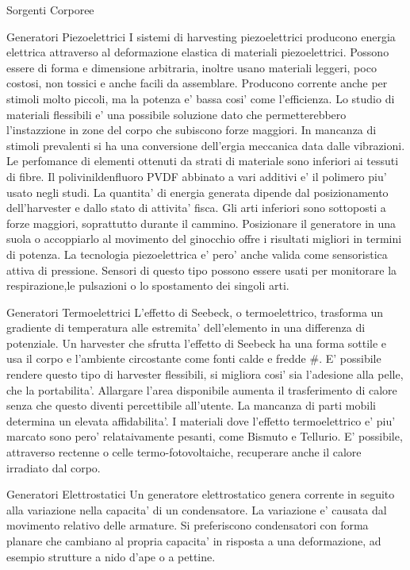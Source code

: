 \begin{multicols}{2}
\begin{section}{Sorgenti Corporee}
   \begin{subsection}{Generatori Piezoelettrici}
    I sistemi di harvesting piezoelettrici producono energia elettrica attraverso al deformazione elastica di materiali piezoelettrici. Possono essere di forma e dimensione arbitraria, inoltre usano materiali leggeri, poco costosi, non tossici e anche facili da assemblare. Producono corrente anche per stimoli molto piccoli, ma la potenza e' bassa cosi' come l'efficienza. Lo studio di materiali flessibili e' una possibile soluzione dato che permetterebbero l'instazzione in zone del corpo che subiscono forze maggiori. In mancanza di stimoli prevalenti si ha una conversione dell'ergia meccanica data dalle vibrazioni. Le perfomance di elementi ottenuti da strati di materiale sono inferiori ai tessuti di fibre. Il polivinildenfluoro PVDF abbinato a vari additivi e' il polimero piu' usato negli studi. La quantita' di energia generata dipende dal posizionamento dell'harvester e dallo stato di attivita' fisca. Gli arti inferiori sono sottoposti a forze maggiori, soprattutto durante il cammino. Posizionare il generatore in una suola o accoppiarlo al movimento del ginocchio offre i risultati migliori in termini di potenza. La tecnologia piezoelettrica e' pero' anche valida come sensoristica attiva di pressione. Sensori di questo tipo possono essere usati per monitorare la respirazione,le pulsazioni o lo spostamento dei singoli arti.
   \end{subsection}

   \begin{subsection}{Generatori Termoelettrici}
    L'effetto di Seebeck, o termoelettrico, trasforma un gradiente di temperatura alle estremita' dell'elemento in una differenza di potenziale. Un harvester che sfrutta l'effetto di Seebeck ha una forma sottile e usa il corpo e l'ambiente circostante come fonti calde e fredde \#. E' possibile rendere questo tipo di harvester flessibili, si migliora cosi' sia l'adesione alla pelle, che la portabilita'. Allargare l'area disponibile aumenta il trasferimento di calore senza che questo diventi percettibile all'utente. La mancanza di parti mobili determina un elevata affidabilita'. I materiali dove l'effetto termoelettrico e' piu' marcato sono pero' relataivamente pesanti, come Bismuto e Tellurio. E' possibile, attraverso rectenne o celle termo-fotovoltaiche, recuperare anche il calore irradiato dal corpo.
   \end{subsection}

   \begin{subsection}{Generatori Elettrostatici}
    Un generatore elettrostatico genera corrente in seguito alla variazione nella capacita' di un condensatore. La variazione e' causata dal movimento relativo delle armature. Si preferiscono condensatori con forma planare che cambiano al propria capacita' in risposta a una deformazione, ad esempio strutture a nido d'ape o a pettine.
   \end{subsection}


\end{section}
\end{multicols}
